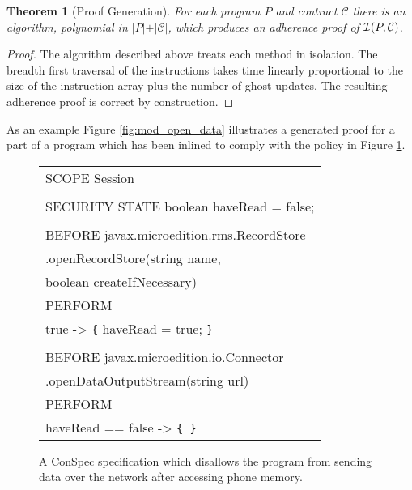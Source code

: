 \documentclass[10pt,twocolumn]{article}
\newtheorem{theorem}{Theorem}
\newcommand{\Size}[1]{\mbox{$|$}{#1}\mbox{$|$}}
\newcommand{\Contract}{\mathcal{C}}
\newcommand{\Inline}{{\cal I}}
\begin{document}
\begin{theorem}[Proof Generation]\label{thm:proof_generation}
For each program $P$ and contract $\Contract$ there is an algorithm, 
polynomial in $\Size{P}+\Size{\Contract}$, which produces an adherence proof 
of $\Inline(P, \Contract)$.
\end{theorem}
\begin{proof}
The algorithm described above treats each method in isolation. The 
breadth first traversal of the instructions takes time linearly 
proportional to the size of the instruction array plus the number of 
ghost updates. The resulting adherence proof is correct by construction.
\end{proof}
As an example Figure \ref{fig:mod_open_data} illustrates a generated proof 
for a part of a program which has been inlined to comply with the 
policy in Figure \ref{fig:demo_secspec}.
\begin{figure}[!ht]
\centering
{\ttfamily
\begin{tabular}{@{~~}l@{~~}}
SCOPE Session\\
\\
SECURITY STATE boolean haveRead = false;\\
\\
BEFORE javax.microedition.rms.RecordStore\\
\phantom{~~~~~~~~}.openRecordStore(string name,\\
\phantom{~~~~~~~~}boolean createIfNecessary)\\
\phantom{~~~~}PERFORM\\
\phantom{~~~~~~~~}true -> \verb+{+ haveRead = true; \verb+}+\\
\\
BEFORE javax.microedition.io.Connector\\
\phantom{~~~~~~~~}.openDataOutputStream(string url) \\
\phantom{~~~~}PERFORM\\
\phantom{~~~~~~~~}haveRead == false -> \verb+{ }+\\
\end{tabular}
}
\caption{\label{fig:demo_secspec} A ConSpec specification which disallows the program from sending data over the network after accessing phone memory.}
\end{figure}
\end{document}
